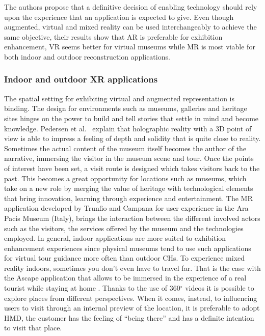 The authors propose that a definitive decision of enabling technology should rely upon the experience that an application is expected to give. Even though augmented, virtual and mixed reality can be used interchangeably to achieve the same objective, their results show that AR is preferable for exhibition enhancement, VR seems better for virtual museums while MR is most viable for both indoor and outdoor reconstruction applications.

\subsubsection{Indoor and outdoor XR applications}
The spatial setting for exhibiting virtual and augmented representation is binding. The design for environments such as museums, galleries and heritage sites hinges on the power to build and tell stories that settle in mind and become knowledge. Pedersen et al.~\cite{pedersen_more_2017} explain that holographic reality with a 3D point of view is able to impress a feeling of depth and solidity that is quite close to reality. Sometimes the actual content of the museum itself becomes the author of the narrative, immersing the visitor in the museum scene and tour. Once the points of interest have been set, a visit route is designed which takes visitors back to the past. This becomes a great opportunity for locations such as museums, which take on a new role by merging the value of heritage with technological elements that bring innovation, learning through experience and entertainment. The \gls{MR} application developed by Trunfio and Campana \cite{jung_augmented_2020} for user experience in the Ara Pacis Museum (Italy), brings the interaction between the different involved actors such as the visitors, the services offered by the museum and the technologies employed.
In general, indoor applications are more suited to exhibition enhancement experiences since physical museums tend to use such applications for virtual tour guidance more often than outdoor CHs.
To experience mixed reality indoors, sometimes you don't even have to travel far. That is the case with the Ascape application that allows to be immersed in the experience of a real tourist while staying at home \cite{cranmer_understanding_2016}. Thanks to the use of 360$^{\circ}$ videos it is possible to explore places from different perspectives. When it comes, instead, to influencing users to visit through an internal preview of the location, it is preferable to adopt \gls{HMD}, the customer has the feeling of “being there” and has a definite intention to visit that place.

